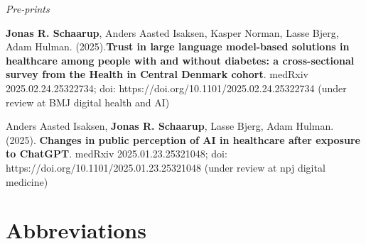 \documentclass[
  a4paper,
  headsepline=true,
  open=any]{scrbook}
\begin{document}
\emph{Pre-prints}

\textbf{Jonas R. Schaarup}, Anders Aasted Isaksen, Kasper Norman, Lasse
Bjerg, Adam Hulman. (2025).\textbf{Trust in large language model-based
solutions in healthcare among people with and without diabetes: a
cross-sectional survey from the Health in Central Denmark cohort}.
medRxiv 2025.02.24.25322734; doi:
https://doi.org/10.1101/2025.02.24.25322734 (under review at BMJ digital
health and AI)

Anders Aasted Isaksen, \textbf{Jonas R. Schaarup}, Lasse Bjerg, Adam
Hulman. (2025). \textbf{Changes in public perception of AI in healthcare
after exposure to ChatGPT}. medRxiv 2025.01.23.25321048; doi:
https://doi.org/10.1101/2025.01.23.25321048 (under review at npj digital
medicine)

\newpage

{\let\clearpage\relax \tableofcontents} 

\listoffigures

\listoftables


\hypertarget{abbreviations}{%
\chapter*{Abbreviations}\label{abbreviations}}

\end{document}
